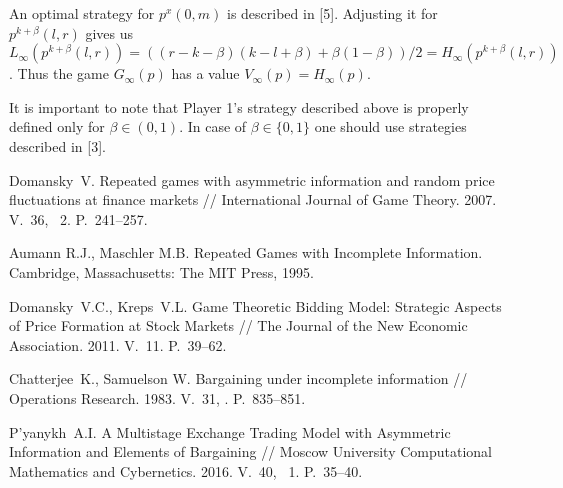 An optimal strategy for $p^x(0, m)$ is described in [5]. Adjusting it for
$p^{k+\beta}(l, r)$ gives us $L_\infty(p^{k+\beta}(l, r)) = ((r - k - \beta)(k -
l + \beta) + \beta(1-\beta))/2 = H_\infty(p^{k+\beta}(l, r))$. Thus the game
$G_\infty(p)$ has a value $V_\infty(p) = H_\infty(p)$.

It is important to note that Player 1's strategy described above is properly
defined only for $\beta \in (0, 1)$. In case of $\beta \in \{0, 1\}$ one should
use strategies described in [3].


\begin{references_eng}

\item %
  Domansky~V. Repeated games with asymmetric information and random price fluctuations at finance markets // International Journal of Game Theory. 2007. V.~36, \No~2. P.~241--257.

\item
  Aumann R.J., Maschler M.B. Repeated Games with Incomplete Information. Cambridge, Massachusetts: The MIT Press, 1995.

\item %
  Domansky~V.C., Kreps~V.L. Game Theoretic Bidding Model: Strategic Aspects of Price Formation at Stock Markets // The Journal of the New Economic Association. 2011. V.~11. P.~39--62.

\item
  Chatterjee~K., Samuelson W. Bargaining under incomplete information //
  Operations Research. 1983. V.~31, . P.~835--851.

\item
  P'yanykh~A.I. A Multistage Exchange Trading Model with Asymmetric Information and Elements of Bargaining // Moscow University Computational Mathematics and Cybernetics. 2016. V.~40, \No~1. P.~35--40.

\end{references_eng}


